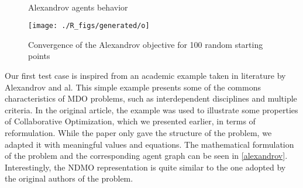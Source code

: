 \begin{figure}[t]
\centering

	\vspace{-20pt}
	\\
	
	\caption{Alexandrov agents behavior}
	\label{alexandrov_res_one}

\end{figure}

\begin{wrapfigure}{R}{0.4\textwidth}
	\vspace{-50pt}
    \texttt{[image: ./R\_figs/generated/o]}
	\caption{Convergence of the Alexandrov objective for 100 random starting points}
	\label{alexandrov_res}
	\vspace{-25pt}
\end{wrapfigure}

Our first test case is inspired from an academic example taken in literature by Alexandrov and al\cite{alexandrov2002analytical}. This simple example presents some of the commons characteristics of MDO problems, such as interdependent disciplines and multiple criteria. In the original article, the example was used to illustrate some properties of Collaborative Optimization, which we presented earlier, in terms of reformulation. While the paper only gave the structure of the problem, we adapted it with meaningful values and equations.
The mathematical formulation of the problem and the corresponding agent graph can be seen in \figurename \ref{alexandrov}. Interestingly, the NDMO representation is quite similar to the one adopted by the original authors of the problem.

